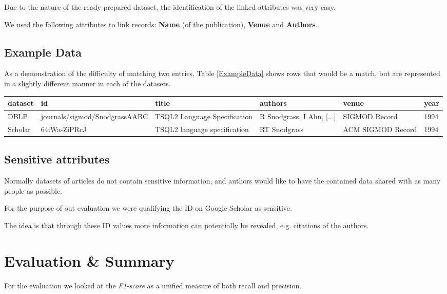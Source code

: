 \documentclass[sigconf,nonacm]{acmart}
\begin{document}
Due to the nature of the ready-prepared dataset, the identification of the
linked attributes was very easy.

We used the following attributes to link records:
\textbf{Name} (of the publication), \textbf{Venue} and \textbf{Authors}.

\subsection{Example Data}

As a demonstration of the difficulty of matching two entries, Table \ref{ExampleData} shows rows that would be a match, but are represented in a slightly different manner in each of the datasets.

\begin{table*}[t]
	\begin{tabular}{|l|l|l|l|l|l|}
	\hline
	dataset & id & title                        & authors                                                                                                                                                                              & venue             & year \\ \hline
	DBLP    &  journals/sigmod/SnodgrassAABC  & TSQL2 Language Specification & R Snodgrass, I Ahn, [...] & SIGMOD Record     & 1994 \\ \hline
	Scholar &   64iWa-ZiPRcJ & TSQL2 language specification & RT Snodgrass                                                                                                                                                                         & ACM SIGMOD Record & 1994 \\ \hline
	\end{tabular}
	\caption{Example Data Entries from DBLP and Scholar Dataset (id and authors column abbreviated)}
	\label{ExampleData}
\end{table*}

\subsection{Sensitive attributes}

Normally datasets of articles do not contain sensitive information,
and authors would like to have the contained data shared with
as many people as possible.

For the purpose of out evaluation we were qualifying the
ID on Google Scholar as sensitive.

The idea is that through these ID values more information
can potentially be revealed, e.g. citations of the authors.

\section{Evaluation \& Summary}

For the evaluation we looked at the \emph{F1-score} as a unified
measure of both recall and precision.



\end{document}
